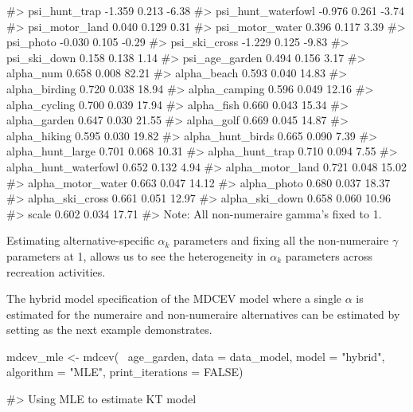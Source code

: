 \begin{Schunk}
\begin{Soutput}
#> psi_hunt_trap          -1.359   0.213  -6.38
#> psi_hunt_waterfowl     -0.976   0.261  -3.74
#> psi_motor_land          0.040   0.129   0.31
#> psi_motor_water         0.396   0.117   3.39
#> psi_photo              -0.030   0.105  -0.29
#> psi_ski_cross          -1.229   0.125  -9.83
#> psi_ski_down            0.158   0.138   1.14
#> psi_age_garden          0.494   0.156   3.17
#> alpha_num               0.658   0.008  82.21
#> alpha_beach             0.593   0.040  14.83
#> alpha_birding           0.720   0.038  18.94
#> alpha_camping           0.596   0.049  12.16
#> alpha_cycling           0.700   0.039  17.94
#> alpha_fish              0.660   0.043  15.34
#> alpha_garden            0.647   0.030  21.55
#> alpha_golf              0.669   0.045  14.87
#> alpha_hiking            0.595   0.030  19.82
#> alpha_hunt_birds        0.665   0.090   7.39
#> alpha_hunt_large        0.701   0.068  10.31
#> alpha_hunt_trap         0.710   0.094   7.55
#> alpha_hunt_waterfowl    0.652   0.132   4.94
#> alpha_motor_land        0.721   0.048  15.02
#> alpha_motor_water       0.663   0.047  14.12
#> alpha_photo             0.680   0.037  18.37
#> alpha_ski_cross         0.661   0.051  12.97
#> alpha_ski_down          0.658   0.060  10.96
#> scale                   0.602   0.034  17.71
#> Note: All non-numeraire gamma's fixed to 1.
\end{Soutput}
\end{Schunk}

Estimating alternative-specific \(\alpha_k\) parameters and fixing all
the non-numeraire \(\gamma\) parameters at 1, allows us to see the
heterogeneity in \(\alpha_k\) parameters across recreation activities.

The hybrid model specification of the MDCEV model where a single
\(\alpha\) is estimated for the numeraire and non-numeraire alternatives
can be estimated by setting  as the next example
demonstrates.

\begin{Schunk}
\begin{Sinput}
mdcev_mle <- mdcev(~ age_garden,
                  data = data_model,
                  model = "hybrid",
                  algorithm = "MLE",
                  print_iterations = FALSE)
\end{Sinput}
\begin{Soutput}
#> Using MLE to estimate KT model
\end{Soutput}
\end{Schunk}


